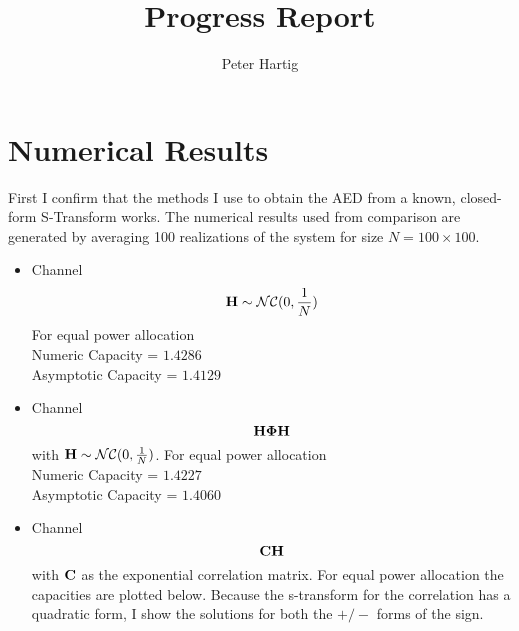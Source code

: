 \documentclass[12pt,a4paper]{report}
\title{Progress Report}
\author{Peter Hartig}
\begin{document}
\maketitle
\tableofcontents

\section{Numerical Results}
First I confirm that the methods I use to obtain the AED from a known, closed-form S-Transform works.
The numerical results  used from comparison are generated by averaging 100 realizations of the system for size $N=100 \times 100$.
\begin{itemize}
\item
	Channel 
	\begin{equation}
	\mathbf{H}  \sim \mathcal{NC}(0,\frac{1}{N})
	\end{equation}
	For equal power allocation 
	\\
	Numeric Capacity = $  1.4286$ 
	\\
	Asymptotic Capacity = $ 1.4129 $
	
\item
	Channel 
	\begin{equation}
	\mathbf{H} \boldsymbol{\Phi} \mathbf{H}  
	\end{equation}
	with $\mathbf{H} \sim \mathcal{NC}(0,\frac{1}{N})$.
	For equal power allocation 
	\\
	Numeric Capacity = $ 1.4227$ 
	\\
	Asymptotic Capacity = $ 1.4060 $	
	
\item
	Channel 
	\begin{equation}
	\mathbf{C}\mathbf{H}  
	\end{equation}
	with $\mathbf{C}$ as the exponential correlation matrix. 
	For equal power allocation the capacities are plotted below. Because the s-transform for the correlation has a quadratic form, I show the solutions for both the $+/-$ forms of the sign.
	

\end{itemize}
\end{document}
